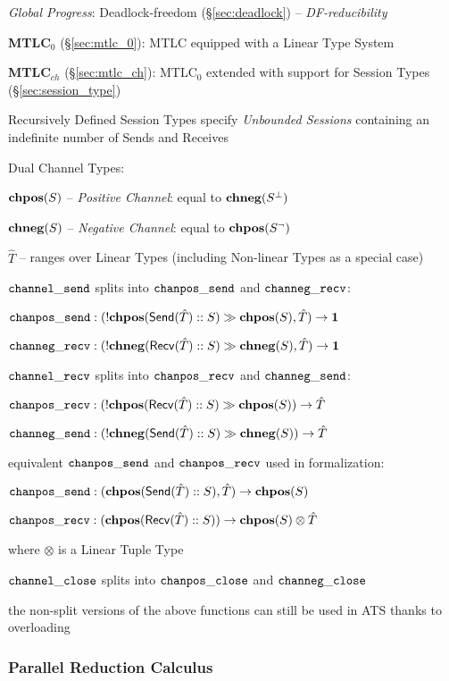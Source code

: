 \emph{Global Progress}: Deadlock-freedom (\S\ref{sec:deadlock}) --
\emph{DF-reducibility}

\fist \textbf{MTLC$_0$} (\S\ref{sec:mtlc_0}): MTLC equipped with a
Linear Type System

\fist \textbf{MTLC$_{ch}$} (\S\ref{sec:mtlc_ch}): MTLC$_0$ extended
with support for Session Types (\S\ref{sec:session_type})

Recursively Defined Session Types specify \emph{Unbounded Sessions}
containing an indefinite number of Sends and Receives


Dual Channel Types:

$\mathbf{chpos}(S)$ -- \emph{Positive Channel}: equal to $\mathbf{chneg}(S^\bot)$

$\mathbf{chneg}(S)$ -- \emph{Negative Channel}: equal to $\mathbf{chpos}(S^\neg)$

$\hat{T}$ -- ranges over Linear Types (including Non-linear Types as a
special case)

$\mathtt{channel\_send}$ splits into $\mathtt{chanpos\_send}$ and $\mathtt{channeg\_recv}$:

$\mathtt{chanpos\_send} : (!\mathbf{chpos}(\mathsf{Send}(\hat{T})::S) \gg \mathbf{chpos}(S), \hat{T})
\rightarrow \mathsf{\mathbf{1}}$

$\mathtt{channeg\_recv} : (!\mathbf{chneg}(\mathsf{Recv}(\hat{T})::S) \gg \mathbf{chneg}(S), \hat{T})
\rightarrow \mathsf{\mathbf{1}}$

$\mathtt{channel\_recv}$ splits into $\mathtt{chanpos\_recv}$ and $\mathtt{channeg\_send}$:

$\mathtt{chanpos\_recv} : (!\mathbf{chpos}(\mathsf{Recv}(\hat{T})::S) \gg \mathbf{chpos}(S))
\rightarrow \hat{T}$

$\mathtt{channeg\_send} : (!\mathbf{chneg}(\mathsf{Send}(\hat{T})::S) \gg \mathbf{chneg}(S))
\rightarrow \hat{T}$

equivalent $\mathtt{chanpos\_send}$ and $\mathtt{chanpos\_recv}$ used in formalization:

$\mathtt{chanpos\_send} : (\mathbf{chpos}(\mathsf{Send}(\hat{T})::S), \hat{T}) \rightarrow \mathbf{chpos}(S)$

$\mathtt{chanpos\_recv} : (\mathbf{chpos}(\mathsf{Recv}(\hat{T})::S)) \rightarrow \mathbf{chpos}(S)
\otimes \hat{T}$

where $\otimes$ is a Linear Tuple Type

$\mathtt{channel\_close}$ splits into $\mathtt{chanpos\_close}$ and $\mathtt{channeg\_close}$

the non-split versions of the above functions can still be used in ATS
thanks to overloading

\endgroup



\subsubsection{Parallel Reduction Calculus}
\label{sec:parallel_reduction_calculus}

